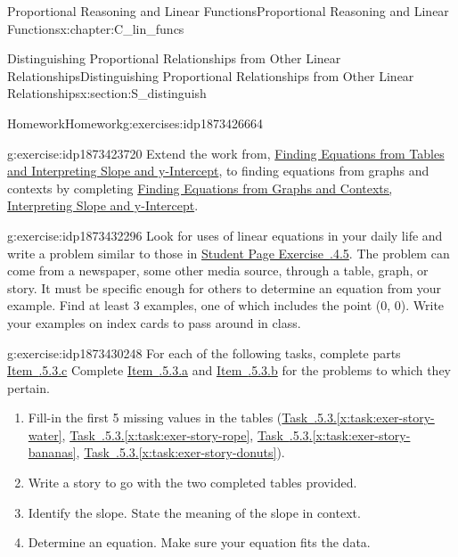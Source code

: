 \documentclass[oneside,10pt,]{book}
\newcommand{\xreffont}{\relax}
\numberwithin{equation}{chapter}
\begin{document}
\begin{chapterptx}{Proportional Reasoning and Linear Functions}{}{Proportional Reasoning and Linear Functions}{}{}{x:chapter:C_lin_funcs}
\begin{sectionptx}{Distinguishing Proportional Relationships from Other Linear Relationships}{}{Distinguishing Proportional Relationships from Other Linear Relationships}{}{}{x:section:S_distinguish}
\begin{exercises-subsection}{Homework}{}{Homework}{}{}{g:exercises:idp1873426664}
\begin{divisionexercise}{1}{}{}{g:exercise:idp1873423720}%
Extend the work from, \hyperref[x:worksheet:act-slope-int]{Finding Equations from Tables and Interpreting Slope and y-Intercept}, to finding equations from graphs and contexts by completing \hyperref[x:worksheet:act-find-eqs]{Finding Equations from Graphs and Contexts, Interpreting Slope and y-Intercept}.%
\end{divisionexercise}%
\begin{divisionexercise}{2}{}{}{g:exercise:idp1873432296}%
Look for uses of linear equations in your daily life and write a problem similar to those in \hyperlink{x:exercise:exer-slope-contexts}{Student Page Exercise~{\xreffont 2.6.4.5}}. The problem can come from a newspaper, some other media source, through a table, graph, or story. It must be specific enough for others to determine an equation from your example. Find at least 3 examples, one of which includes the point (0, 0). Write your examples on index cards to pass around in class.%
\end{divisionexercise}%
\begin{divisionexercise}{3}{}{}{g:exercise:idp1873430248}%
For each of the following tasks, complete parts \hyperlink{x:li:slope-story-c}{Item~{\xreffont 2.6.5.3.c}\textendash{}{\xreffont 2.6.5.3.f}} Complete \hyperlink{x:li:slope-story-a}{Item~{\xreffont 2.6.5.3.a}} and \hyperlink{x:li:slope-story-b}{Item~{\xreffont 2.6.5.3.b}} for the problems to which they pertain.%
\begin{enumerate}[label=(\alph*)]
\item\hypertarget{x:li:slope-story-a}{}Fill-in the first 5 missing values in the tables (\hyperref[x:task:exer-story-water]{Task~{\xreffont 2.6.5.3}.{\xreffont\ref{x:task:exer-story-water}}}, \hyperref[x:task:exer-story-rope]{Task~{\xreffont 2.6.5.3}.{\xreffont\ref{x:task:exer-story-rope}}}, \hyperref[x:task:exer-story-bananas]{Task~{\xreffont 2.6.5.3}.{\xreffont\ref{x:task:exer-story-bananas}}}, \hyperref[x:task:exer-story-donuts]{Task~{\xreffont 2.6.5.3}.{\xreffont\ref{x:task:exer-story-donuts}}}).%
\item\hypertarget{x:li:slope-story-b}{}Write a story to go with the two completed tables provided.%
\item\hypertarget{x:li:slope-story-c}{}Identify the slope. State the meaning of the slope in context.%
\item\hypertarget{x:li:slope-story-d}{}Determine an equation. Make sure your equation fits the data.%

\end{enumerate}
\end{divisionexercise}
\end{exercises-subsection}
\end{sectionptx}
\end{chapterptx}
\end{document}
